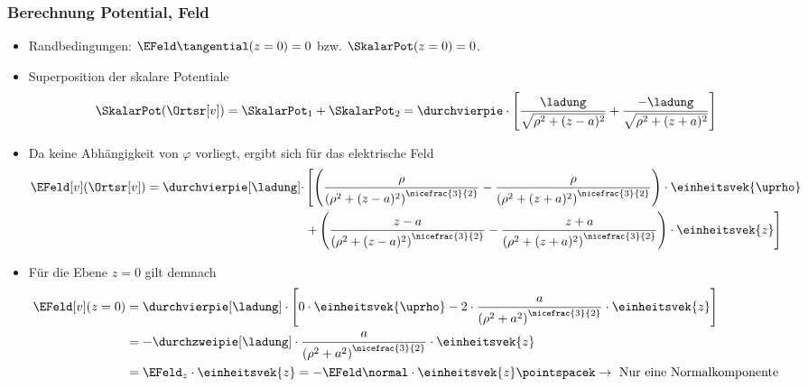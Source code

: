   \begin{frame}
    \frametitle{Berechnung Potential, Feld}

    \begin{itemize}[<+->]
\item  Randbedingungen: \(\EFeld\tangential(z=0) = 0\) bzw. \(\SkalarPot(z=0) = 0\). 

\item Superposition der skalare Potentiale
  \begin{equation*}
	\SkalarPot(\Ortsr[v]) = \SkalarPot_1 + \SkalarPot_2
		= \durchvierpie \cdot \left[ \dfrac{\ladung}{\sqrt{\rho^2 + (z - a)^2}} + \dfrac{-\ladung}{\sqrt{\rho^2 + (z + a)^2}} \right]
\end{equation*}
\item Da keine Abhängigkeit von \(\varphi\) vorliegt, ergibt sich für das elektrische Feld
\begin{equation*}
	\begin{split}
		\EFeld[v](\Ortsr[v]) = \durchvierpie[\ladung] \cdot
                &\left[ \left( \dfrac{\rho}{\left( \rho^2 + (z - a)^2 \right)^{\nicefrac{3}{2}}} - \dfrac{\rho}{\left( \rho^2 + (z + a)^2 \right)^{\nicefrac{3}{2}}} \right) \cdot \einheitsvek{\uprho} \right. \\
		&	 \left. + \left( \dfrac{z - a}{\left( \rho^2 + (z - a)^2 \right)^{\nicefrac{3}{2}}} - \dfrac{z + a}{\left( \rho^2 + (z + a)^2 \right)^{\nicefrac{3}{2}}} \right) \cdot \einheitsvek{z} \right]
	\end{split}
\end{equation*}
\item Für die Ebene \(z = 0\) gilt demnach
\begin{align*}
	\EFeld[v](z=0) &= \durchvierpie[\ladung] \cdot \left[ 0 \cdot \einheitsvek{\uprho} - 2 \cdot \dfrac{a}{\left( \rho^2 + a^2 \right)^{\nicefrac{3}{2}}} \cdot \einheitsvek{z} \right] \\
		&= -\durchzweipie[\ladung] \cdot \dfrac{a}{\left( \rho^2 + a^2 \right)^{\nicefrac{3}{2}}} \cdot \einheitsvek{z} \\
		&= \EFeld_z \cdot \einheitsvek{z} = -\EFeld\normal \cdot \einheitsvek{z} \pointspacek \to \text{ Nur eine Normalkomponente}
\end{align*}
\end{itemize}
\end{frame}

